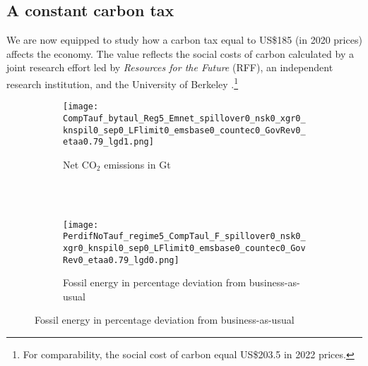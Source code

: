 \subsection{A constant carbon tax}\label{subsec:exp}


We are now equipped to study how a carbon tax  equal to US\$185 (in 2020 prices) affects the economy. The value reflects the social costs of carbon calculated by a joint research effort led by \textit{Resources for the Future} (RFF), an independent research institution, and the University of Berkeley \citep{Rennert2022ComprehensiveCO2}.\footnote{  For comparability, the social cost of carbon equal US\$203.5 in 2022 prices.}


\begin{figure}[h!!]
	\centering
	\caption{A constant carbon tax equal to US\$185 (2020 prices) per ton of carbon  }\label{fig:Leveltauf_nsk0_xgr0_know}		
	\begin{subfigure}[]{0.4\textwidth}
		\caption{Net CO$_2$ emissions in Gt \\ \ }
		\texttt{[image: CompTauf\_bytaul\_Reg5\_Emnet\_spillover0\_nsk0\_xgr0\_knspil0\_sep0\_LFlimit0\_emsbase0\_countec0\_GovRev0\_etaa0.79\_lgd1.png]}
	\end{subfigure}	
	\begin{minipage}[]{0.1\textwidth}
		\
	\end{minipage}
	\begin{subfigure}[]{0.4\textwidth}
		\caption{Fossil energy in percentage deviation from business-as-usual}
		\texttt{[image: PerdifNoTauf\_regime5\_CompTaul\_F\_spillover0\_nsk0\_xgr0\_knspil0\_sep0\_LFlimit0\_emsbase0\_countec0\_GovRev0\_etaa0.79\_lgd0.png]}
	\end{subfigure}
\end{figure} 

